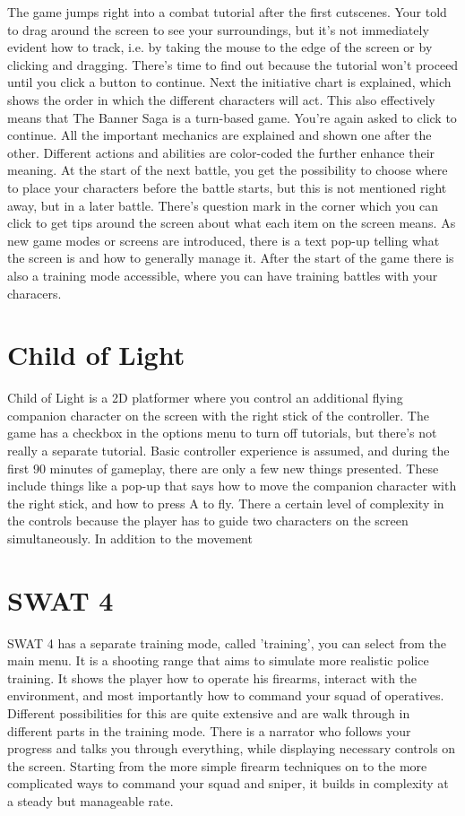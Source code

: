 The game jumps right into a combat tutorial after the first cutscenes. Your told to drag around the screen to see your surroundings, but it's not immediately evident how to track, i.e. by taking the mouse to the edge of the screen or by clicking and dragging. There's time to find out because the tutorial won't proceed until you click a button to continue. Next the initiative chart is explained, which shows the order in which the different characters will act. This also effectively means that The Banner Saga is a turn-based game. You're again asked to click to continue. All the important mechanics are explained and shown one after the other. Different actions and abilities are color-coded the further enhance their meaning. At the start of the next battle, you get the possibility to choose where to place your characters before the battle starts, but this is not mentioned right away, but in a later battle. There's question mark in the corner which you can click to get tips around the screen about what each item on the screen means. As new game modes or screens are introduced, there is a text pop-up telling what the screen is and how to generally manage it. After the start of the game there is also a training mode accessible, where you can have training battles with your characers.

\section{Child of Light}

Child of Light is a 2D platformer where you control an additional flying companion character on the screen with the right stick of the controller. The game has a checkbox in the options menu to turn off tutorials, but there's not really a separate tutorial. Basic controller experience is assumed, and during the first 90 minutes of gameplay, there are only a few new things presented. These include things like a pop-up that says how to move the companion character with the right stick, and how to press A to fly. There a certain level of complexity in the controls because the player has to guide two characters on the screen simultaneously. In addition to the movement

\section{SWAT 4}

SWAT 4 has a separate training mode, called 'training', you can select from the main menu. It is a shooting range that aims to simulate more realistic police training. It shows the player how to operate his firearms, interact with the environment, and most importantly how to command your squad of operatives. Different possibilities for this are quite extensive and are walk through in different parts in the training mode. There is a narrator who follows your progress and talks you through everything, while displaying necessary controls on the screen. Starting from the more simple firearm techniques on to the more complicated ways to command your squad and sniper, it builds in complexity at a steady but manageable rate.